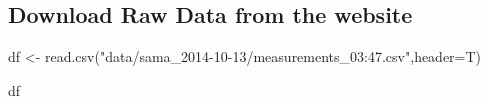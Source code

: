 \documentclass[
]{article}
\newenvironment{Shaded}{\begin{snugshade}}{\end{snugshade}}
\newcommand{\AttributeTok}[1]{\textcolor[rgb]{0.77,0.63,0.00}{#1}}
\newcommand{\FunctionTok}[1]{\textcolor[rgb]{0.00,0.00,0.00}{#1}}
\newcommand{\NormalTok}[1]{#1}
\newcommand{\OtherTok}[1]{\textcolor[rgb]{0.56,0.35,0.01}{#1}}
\newcommand{\StringTok}[1]{\textcolor[rgb]{0.31,0.60,0.02}{#1}}
\begin{document}
\hypertarget{download-raw-data-from-the-website}{%
\subsection{Download Raw Data from the
website}\label{download-raw-data-from-the-website}}

\begin{Shaded}
\begin{Highlighting}[]
\NormalTok{df }\OtherTok{\textless{}{-}} \FunctionTok{read.csv}\NormalTok{(}\StringTok{"data/sama\_2014{-}10{-}13/measurements\_03:47.csv"}\NormalTok{,}\AttributeTok{header=}\NormalTok{T)}
\end{Highlighting}
\end{Shaded}

\begin{Shaded}
\begin{Highlighting}[]
\NormalTok{df}
\end{Highlighting}
\end{Shaded}
\end{document}
